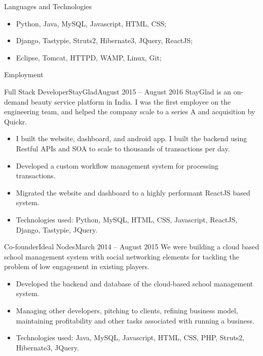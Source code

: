 \documentclass[]{mcdowellcv}
\begin{document}
	\makeheader

	\begin{cvsection}{Languages and Technologies}
		\begin{cvsubsection}{}{}{}	
			\begin{itemize}
				\item Python, Java, MySQL, Javascript, HTML, CSS;
				\item Django, Tastypie, Struts2, Hibernate3, JQuery, ReactJS;
				\item Eclipse, Tomcat, HTTPD, WAMP, Linux, Git;
			\end{itemize}
		\end{cvsubsection}
	\end{cvsection}
	
	\begin{cvsection}{Employment}
		\begin{cvsubsection}{Full Stack Developer}{StayGlad}{August 2015 – August 2016}
			StayGlad is an on-demand beauty service platform in India. I was the first employee on the engineering team, and helped the company scale to a series A and acquisition by Quickr.
			\begin{itemize}
				\item I built the website, dashboard, and android app. I built the backend using Restful APIs and SOA to scale to thousands of transactions per day.
				\item Developed a custom workflow management system for processing transactions.
				\item Migrated the website and dashboard to a highly performant ReactJS based system.
				\item Technologies used: Python, MySQL, HTML, CSS, Javascript, ReactJS, Django, Tastypie, JQuery.
			\end{itemize}
		\end{cvsubsection}
		
		\begin{cvsubsection}{Co-founder}{Ideal Nodes}{March 2014 – August 2015}	
			We were building a cloud based school management system with social networking elements for tackling the problem of low engagement in existing players.
			\begin{itemize}
				\item Developed the backend and database of the cloud-based school management system.
				\item Managing other developers, pitching to clients, refining business model, maintaining profitability and other tasks associated with running a business.
				\item Technologies used: Java, MySQL, Javascript, HTML, CSS, PHP, Struts2, Hibernate3, JQuery.
			\end{itemize}
		\end{cvsubsection}
		

\end{cvsection}
\end{document}
